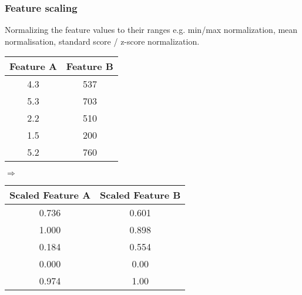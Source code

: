 \documentclass[aspectratio=169]{beamer}
\begin{document}
\begin{frame}
  \frametitle{Feature scaling}
  \begin{block}{}

    \begin{center}
      Normalizing the feature values to their ranges e.g. min/max
      normalization, mean normalisation, standard score / z-score
      normalization.
    \end{center}
    
    \vspace{0.5cm}
    \hspace{1cm}
    \begin{minipage}{0.33\textwidth}
      {\small
        \begin{tabular}{|c|c|}
          \hline
          \textbf{Feature A} & \textbf{Feature B}\\
          \hline
          4.3 & 537\\
          5.3 & 703\\
          2.2 & 510\\
          1.5 & 200\\
          5.2 & 760\\
          \hline          
        \end{tabular}
      }
    \end{minipage}
    \begin{minipage}{0.08\textwidth}
      $\Rightarrow$
    \end{minipage}        
    \begin{minipage}{0.40\textwidth}
      {\small
        \begin{tabular}{|c|c|}
          \hline
          \textbf{Scaled Feature A} & \textbf{Scaled Feature B}\\
          \hline
          0.736 & 0.601\\
          1.000 & 0.898\\
          0.184 & 0.554\\
          0.000 & 0.00\\
          0.974 & 1.00\\
          \hline          
        \end{tabular}
      }
    \end{minipage}
    \hspace{1cm}
    \vspace{0.5cm}
  \end{block}
\end{frame}
\end{document}
